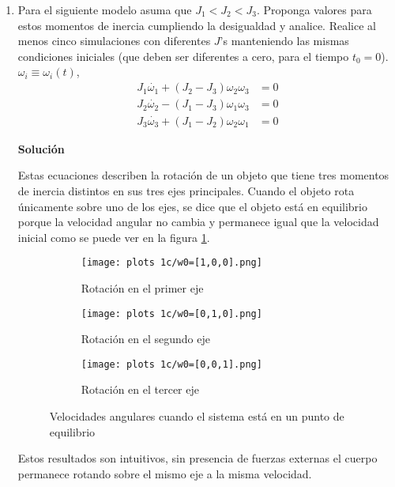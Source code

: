 \documentclass[letterpaper, 12pt]{article}
\begin{document}
\begin{enumerate}
\begin{enumerate}
\item Para el siguiente modelo asuma que $J_1 < J_2 < J_3$. Proponga valores para estos momentos de inercia cumpliendo la desigualdad y analice. Realice al menos cinco simulaciones con diferentes $J$'s manteniendo las mismas condiciones iniciales (que deben ser diferentes a cero, para el tiempo $t_0 = 0$). $\omega_i \equiv \omega_i(t)$,
\begin{equation}
\begin{split}
    J_1\dot{\omega_1} + \left( J_2 - J_3\right)\omega_2\omega_3 &= 0 \\
    J_2\dot{\omega_2} - \left( J_1 - J_3\right)\omega_1\omega_3 &= 0 \\
    J_3\dot{\omega_3} + \left( J_1 - J_2\right)\omega_2\omega_1 &= 0
\end{split}
\end{equation}

\textbf{Solución}

Estas ecuaciones describen la rotación de un objeto que tiene tres momentos de inercia distintos en sus tres ejes principales.
Cuando el objeto rota únicamente sobre uno de los ejes, se dice que el objeto está en equilibrio porque la velocidad angular no cambia y permanece igual que la velocidad inicial como se puede ver en la figura \ref{fig:sistema en punto de equilibrio}.

\begin{figure}[h!]
    \centering
    \hspace{1cm}
    \begin{subfigure}[h]{0.28\linewidth}
        \texttt{[image: plots 1c/w0=[1,0,0].png]}
        \caption{\centering Rotación en el primer eje}
    \end{subfigure}
    \begin{subfigure}[h]{0.28\linewidth}
        \texttt{[image: plots 1c/w0=[0,1,0].png]}
        \caption{\centering Rotación en el segundo eje}
    \end{subfigure}
    \begin{subfigure}[h]{0.28\linewidth}
        \texttt{[image: plots 1c/w0=[0,0,1].png]}
        \caption{\centering Rotación en el tercer eje}
    \end{subfigure}
    \caption{Velocidades angulares cuando el sistema está en un punto de equilibrio}
    \label{fig:sistema en punto de equilibrio}
\end{figure}

Estos resultados son intuitivos, sin presencia de fuerzas externas el cuerpo permanece rotando sobre el mismo eje a la misma velocidad.


\end{enumerate}
\end{enumerate}
\end{document}
